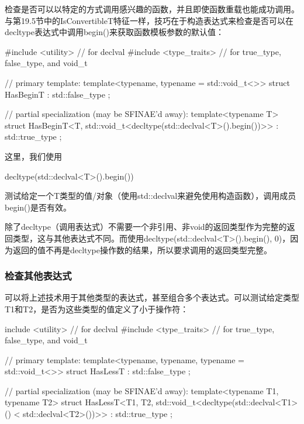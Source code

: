 检查是否可以以特定的方式调用感兴趣的函数，并且即使函数重载也能成功调用。与第19.5节中的IsConvertibleT特征一样，技巧在于构造表达式来检查是否可以在decltype表达式中调用begin()来获取函数模板参数的默认值：

\begin{cpp}
#include <utility> // for declval
#include <type_traits> // for true_type, false_type, and void_t

// primary template:
template<typename, typename = std::void_t<>>
struct HasBeginT : std::false_type {};

// partial specialization (may be SFINAE'd away):
template<typename T>
struct HasBeginT<T, std::void_t<decltype(std::declval<T>().begin())>>
: std::true_type {};
\end{cpp}

这里，我们使用

\begin{cpp}
decltype(std::declval<T>().begin())
\end{cpp}

测试给定一个T类型的值/对象（使用std::declval来避免使用构造函数），调用成员begin()是否有效。

\begin{notice}
除了decltype（调用表达式）不需要一个非引用、非void的返回类型作为完整的返回类型，这与其他表达式不同。而使用decltype(std::declval<T>().begin(), 0)，因为返回的值不再是decltype操作数的结果，所以要求调用的返回类型完整。
\end{notice}

\subsubsection{检查其他表达式}

可以将上述技术用于其他类型的表达式，甚至组合多个表达式。可以测试给定类型T1和T2，是否为这些类型的值定义了小于操作符：

\begin{cpp}
include <utility> // for declval
#include <type_traits> // for true_type, false_type, and void_t

// primary template:
template<typename, typename, typename = std::void_t<>>
struct HasLessT : std::false_type
{};

// partial specialization (may be SFINAE'd away):
template<typename T1, typename T2>
struct HasLessT<T1, T2, std::void_t<decltype(std::declval<T1>()
					< std::declval<T2>())>>
: std::true_type
{};
\end{cpp}

